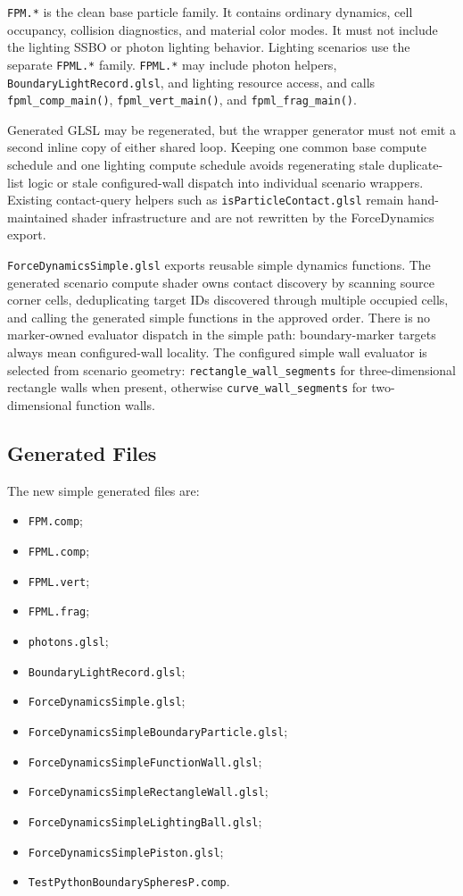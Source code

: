 \texttt{FPM.*} is the clean base particle family.  It contains ordinary
dynamics, cell occupancy, collision diagnostics, and material color modes.  It
must not include the lighting SSBO or photon lighting behavior.  Lighting
scenarios use the separate \texttt{FPML.*} family.  \texttt{FPML.*} may
include photon helpers, \texttt{BoundaryLightRecord.glsl}, and lighting
resource access, and calls \texttt{fpml\_comp\_main()},
\texttt{fpml\_vert\_main()}, and \texttt{fpml\_frag\_main()}.

Generated GLSL may be regenerated, but the wrapper generator must not emit a
second inline copy of either shared loop.  Keeping one common base compute
schedule and one lighting compute schedule avoids regenerating stale
duplicate-list logic or stale configured-wall dispatch into individual
scenario wrappers.  Existing
contact-query helpers such as \texttt{isParticleContact.glsl} remain
hand-maintained shader infrastructure and are not rewritten by the
ForceDynamics export.

\texttt{ForceDynamicsSimple.glsl} exports reusable simple dynamics
functions.  The generated scenario compute shader owns contact discovery by
scanning source corner cells, deduplicating target IDs discovered through
multiple occupied cells, and calling the generated simple functions in the
approved order.  There is no marker-owned evaluator dispatch in the simple
path: boundary-marker targets always mean configured-wall locality.  The
configured simple wall evaluator is selected from scenario geometry:
\texttt{rectangle\_wall\_segments} for three-dimensional rectangle walls when
present, otherwise \texttt{curve\_wall\_segments} for two-dimensional function
walls.

\subsection{Generated Files}

The new simple generated files are:
\begin{itemize}
    \item \texttt{FPM.comp};
    \item \texttt{FPML.comp};
    \item \texttt{FPML.vert};
    \item \texttt{FPML.frag};
    \item \texttt{photons.glsl};
    \item \texttt{BoundaryLightRecord.glsl};
    \item \texttt{ForceDynamicsSimple.glsl};
    \item \texttt{ForceDynamicsSimpleBoundaryParticle.glsl};
    \item \texttt{ForceDynamicsSimpleFunctionWall.glsl};
    \item \texttt{ForceDynamicsSimpleRectangleWall.glsl};
    \item \texttt{ForceDynamicsSimpleLightingBall.glsl};
    \item \texttt{ForceDynamicsSimplePiston.glsl};
    \item \texttt{TestPythonBoundarySpheresP.comp}.
\end{itemize}

